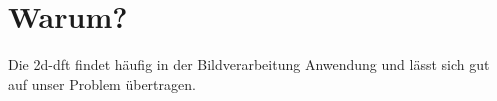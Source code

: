 \section{Warum?}
Die \gls{2d-dft} findet häufig in der Bildverarbeitung Anwendung und lässt sich gut auf unser Problem übertragen.
